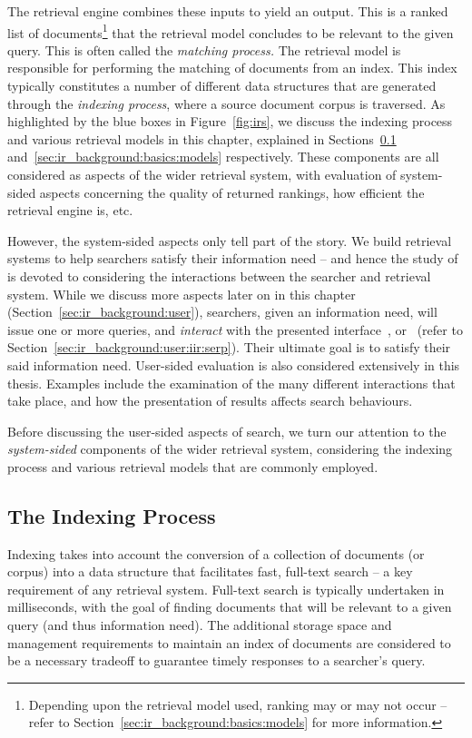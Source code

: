 The retrieval engine combines these inputs to yield an output. This is a ranked list of documents\footnote{Depending upon the retrieval model used, ranking may or may not occur -- refer to Section~\ref{sec:ir_background:basics:models} for more information.} that the retrieval model concludes to be relevant to the given query. This is often called the \emph{matching process.} The retrieval model is responsible for performing the matching of documents from an index. This index typically constitutes a number of different data structures that are generated through the \emph{indexing process}, where a source document corpus is traversed. As highlighted by the blue boxes in Figure~\ref{fig:irs}, we discuss the indexing process and various retrieval models in this chapter, explained in Sections~\ref{sec:ir_background:basics:indexing} and~\ref{sec:ir_background:basics:models} respectively. These components are all considered as  aspects of the wider retrieval system, with evaluation of system-sided aspects concerning the quality of returned rankings, how efficient the retrieval engine is, etc.

However, the system-sided aspects only tell part of the story. We build retrieval systems to help searchers satisfy their information need -- and hence the study of~ is devoted to considering the interactions between the searcher and retrieval system. While we discuss more  aspects later on in this chapter (Section~\ref{sec:ir_background:user}), searchers, given an information need, will issue one or more queries, and \emph{interact} with the presented interface~\citep{ingwersen2005theturn}, or~ (refer to Section~\ref{sec:ir_background:user:iir:serp}). Their ultimate goal is to satisfy their said information need. User-sided evaluation is also considered extensively in this thesis. Examples include the examination of the many different interactions that take place, and how the presentation of results affects search behaviours.

Before discussing the user-sided aspects of search, we turn our attention to the \emph{system-sided} components of the wider retrieval system, considering the indexing process and various retrieval models that are commonly employed.

\subsection{The Indexing Process}\label{sec:ir_background:basics:indexing}
Indexing takes into account the conversion of a collection of documents (or corpus) into a data structure that facilitates fast, full-text search -- a key requirement of any retrieval system. Full-text search is typically undertaken in milliseconds, with the goal of finding documents that will be relevant to a given query (and thus information need). The additional storage space and management requirements to maintain an index of documents are considered to be a necessary tradeoff to guarantee timely responses to a searcher's query.

